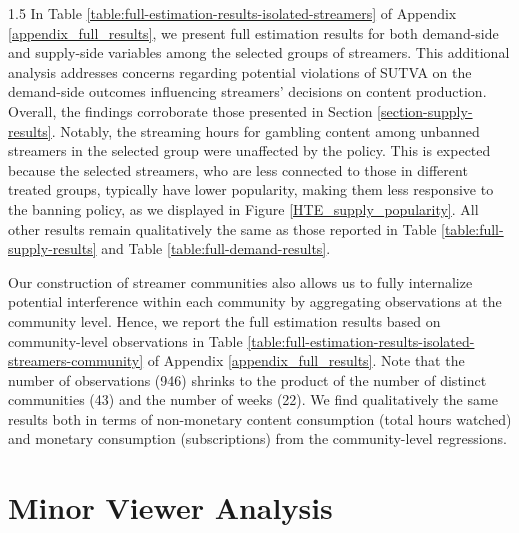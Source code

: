 \documentclass[a4paper,12pt]{article}
\begin{document}
\begin{spacing}{1.5}
In Table \ref{table:full-estimation-results-isolated-streamers} of Appendix \ref{appendix_full_results}, we present full estimation results for both demand-side and supply-side variables among the selected groups of streamers. This additional analysis addresses concerns regarding potential violations of SUTVA on the demand-side outcomes influencing streamers' decisions on content production. Overall, the findings corroborate those presented in Section \ref{section-supply-results}. Notably, the streaming hours for gambling content among unbanned streamers in the selected group were unaffected by the policy. This is expected because the selected streamers, who are less connected to those in different treated groups, typically have lower popularity, making them less responsive to the banning policy, as we displayed in Figure \ref{HTE_supply_popularity}. All other results remain qualitatively the same as those reported in Table \ref{table:full-supply-results} and Table \ref{table:full-demand-results}.

Our construction of streamer communities also allows us to fully internalize potential interference within each community by aggregating observations at the community level. Hence, we report the full estimation results based on community-level observations in Table \ref{table:full-estimation-results-isolated-streamers-community} of Appendix \ref{appendix_full_results}. Note that the number of observations (946) shrinks to the product of the number of distinct communities (43) and the number of weeks (22). We find qualitatively the same results both in terms of non-monetary content consumption (total hours watched) and monetary consumption (subscriptions) from the community-level regressions.

\section{Minor Viewer Analysis}\label{section-minor}

\end{spacing}
\end{document}
